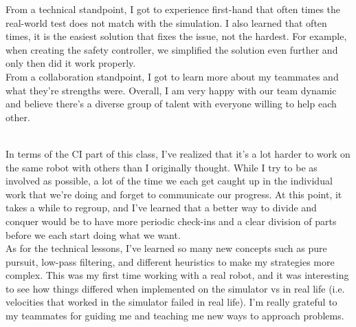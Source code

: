 \documentclass{article}
\begin{document}
From a technical standpoint, I got to experience first-hand that often times the real-world test does not match with the simulation. I also learned that often times, it is the easiest solution that fixes the issue, not the hardest. For example, when creating the safety controller, we simplified the solution even further and only then did it work properly. \\

From a collaboration standpoint, I got to learn more about my teammates and what they're strengths were. Overall, I am very happy with our team dynamic and believe there's a diverse group of talent with everyone willing to help each other. \\

\author{\textbf{Miranda Cai}} \\

In terms of the CI part of this class, I've realized that it's a lot harder to work on the same robot with others than I originally thought. While I try to be as involved as possible, a lot of the time we each get caught up in the individual work that we're doing and forget to communicate our progress. At this point, it takes a while to regroup, and I've learned that a better way to divide and conquer would be to have more periodic check-ins and a clear division of parts before we each start doing what we want.\\

As for the technical lessons, I've learned so many new concepts such as pure pursuit, low-pass filtering, and different heuristics to make my strategies more complex. This was my first time working with a real robot, and it was interesting to see how things differed when implemented on the simulator vs in real life (i.e. velocities that worked in the simulator failed in real life). I'm really grateful to my teammates for guiding me and teaching me new ways to approach problems.\\

\author{\textbf{Tiasa Kim}} \\
\end{document}
